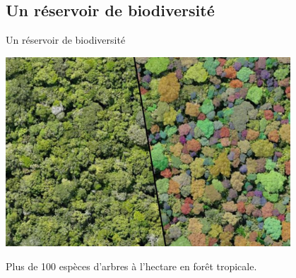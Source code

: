 \documentclass[10pt,table,dvipsnames,compress]{beamer}
\begin{document}
\subsection{Un réservoir de biodiversité}
\label{sec:org7e6bb5b}

\begin{frame}[label={sec:orgf9dbc82}]{Un réservoir de biodiversité}
\begin{center}
\includegraphics[width=0.8\textwidth]{figs/vue-drone-foret-tropicale.jpg}
\end{center}

Plus de 100 espèces d'arbres à l'hectare en forêt tropicale.
\end{frame}
\end{document}
